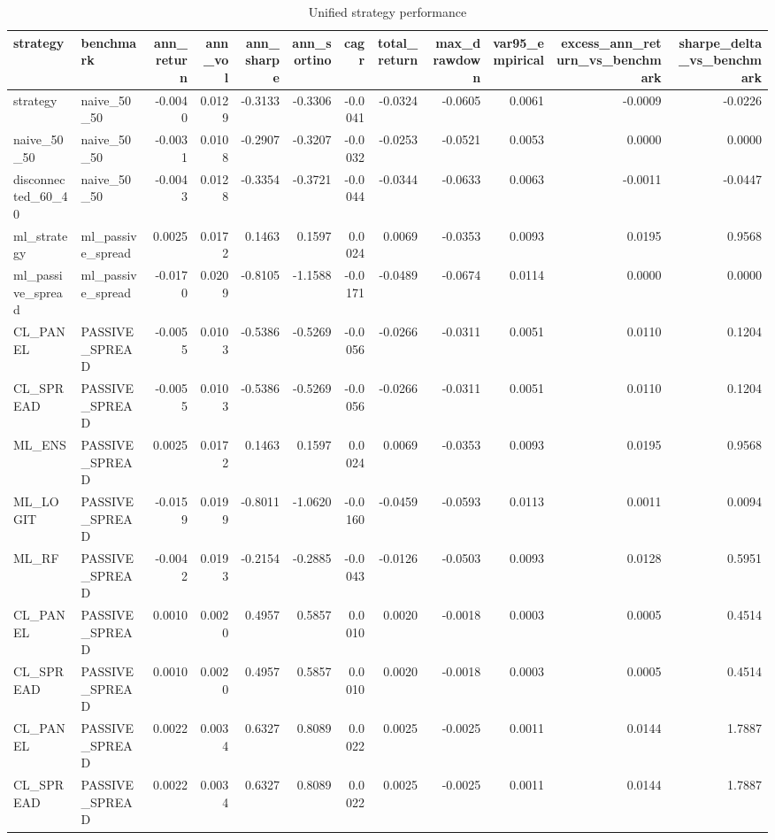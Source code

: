 \begin{table}
\caption{Unified strategy performance}
\label{tab:7_1}
\begin{tabular}{llrrrrrrrrrr}
\toprule
strategy & benchmark & ann_return & ann_vol & ann_sharpe & ann_sortino & cagr & total_return & max_drawdown & var95_empirical & excess_ann_return_vs_benchmark & sharpe_delta_vs_benchmark \\
\midrule
strategy & naive_50_50 & -0.0040 & 0.0129 & -0.3133 & -0.3306 & -0.0041 & -0.0324 & -0.0605 & 0.0061 & -0.0009 & -0.0226 \\
naive_50_50 & naive_50_50 & -0.0031 & 0.0108 & -0.2907 & -0.3207 & -0.0032 & -0.0253 & -0.0521 & 0.0053 & 0.0000 & 0.0000 \\
disconnected_60_40 & naive_50_50 & -0.0043 & 0.0128 & -0.3354 & -0.3721 & -0.0044 & -0.0344 & -0.0633 & 0.0063 & -0.0011 & -0.0447 \\
ml_strategy & ml_passive_spread & 0.0025 & 0.0172 & 0.1463 & 0.1597 & 0.0024 & 0.0069 & -0.0353 & 0.0093 & 0.0195 & 0.9568 \\
ml_passive_spread & ml_passive_spread & -0.0170 & 0.0209 & -0.8105 & -1.1588 & -0.0171 & -0.0489 & -0.0674 & 0.0114 & 0.0000 & 0.0000 \\
CL_PANEL & PASSIVE_SPREAD & -0.0055 & 0.0103 & -0.5386 & -0.5269 & -0.0056 & -0.0266 & -0.0311 & 0.0051 & 0.0110 & 0.1204 \\
CL_SPREAD & PASSIVE_SPREAD & -0.0055 & 0.0103 & -0.5386 & -0.5269 & -0.0056 & -0.0266 & -0.0311 & 0.0051 & 0.0110 & 0.1204 \\
ML_ENS & PASSIVE_SPREAD & 0.0025 & 0.0172 & 0.1463 & 0.1597 & 0.0024 & 0.0069 & -0.0353 & 0.0093 & 0.0195 & 0.9568 \\
ML_LOGIT & PASSIVE_SPREAD & -0.0159 & 0.0199 & -0.8011 & -1.0620 & -0.0160 & -0.0459 & -0.0593 & 0.0113 & 0.0011 & 0.0094 \\
ML_RF & PASSIVE_SPREAD & -0.0042 & 0.0193 & -0.2154 & -0.2885 & -0.0043 & -0.0126 & -0.0503 & 0.0093 & 0.0128 & 0.5951 \\
CL_PANEL & PASSIVE_SPREAD & 0.0010 & 0.0020 & 0.4957 & 0.5857 & 0.0010 & 0.0020 & -0.0018 & 0.0003 & 0.0005 & 0.4514 \\
CL_SPREAD & PASSIVE_SPREAD & 0.0010 & 0.0020 & 0.4957 & 0.5857 & 0.0010 & 0.0020 & -0.0018 & 0.0003 & 0.0005 & 0.4514 \\
CL_PANEL & PASSIVE_SPREAD & 0.0022 & 0.0034 & 0.6327 & 0.8089 & 0.0022 & 0.0025 & -0.0025 & 0.0011 & 0.0144 & 1.7887 \\
CL_SPREAD & PASSIVE_SPREAD & 0.0022 & 0.0034 & 0.6327 & 0.8089 & 0.0022 & 0.0025 & -0.0025 & 0.0011 & 0.0144 & 1.7887 \\

\end{tabular}
\end{table}
